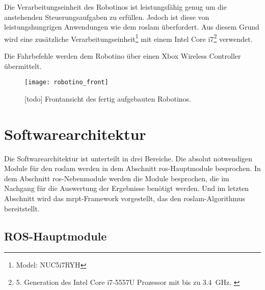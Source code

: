Die Verarbeitungseinheit des Robotinos ist leistungsfähig genug um die anstehenden Steuerungsaufgaben zu erfüllen. Jedoch ist diese von leistungshungrigen Anwendungen wie dem \Gls{roslam} überfordert. Aus diesem Grund wird eine zusätzliche Verarbeitungseinheit\footnote{Model: NUC5i7RYH} mit einem Intel Core i7\footnote{5. Generation des Intel Core i7-5557U Prozessor mit bis zu \SI{3.4}{\GHz}. \cite{intel2015nucproductbrief}} verwendet.

Die Fahrbefehle werden dem Robotino über einen Xbox Wireless Controller übermittelt.

\begin{figure}[h]
	\centering
	\texttt{[image: robotino\_front]}
	\caption{[todo] Frontansicht des fertig aufgebauten Robotinos.}
	\label{fig:robotino_front}
\end{figure}


\begin{comment}
--------------------------------------------------------------------------------
- Kurzbeschreibung der Modulfunktion
- Welche Funktion erfüllt dieses Modul
- Welche ROS-Messages/-Topics/-Services bietet dieses Modul
\end{comment}
\section{Softwarearchitektur}

Die Softwarearchitektur ist unterteilt in drei Bereiche. Die absolut notwendigen Module für den \Gls{roslam} werden in dem Abschnitt \Gls{ros}-Hauptmodule besprochen. In dem Abschnitt \Gls{ros}-Nebenmodule werden die Module besprochen, die im Nachgang für die Auswertung der Ergebnisse benötigt werden. Und im letzten Abschnitt wird das \Gls{mrpt}-Framework vorgestellt, das den \Gls{roslam}-Algorithmus bereitstellt.


\begin{comment}
--------------------------------------------------------------------------------
- todo: Übersicht über alle Module und deren Verbindung zu einander?
\end{comment}
\subsection{ROS-Hauptmodule}


\begin{comment}
--------------------------------------------------------------------------------
- \url{http://wiki.ros.org/robotino_node}
- todo: Service reset_odometry
\end{comment}
